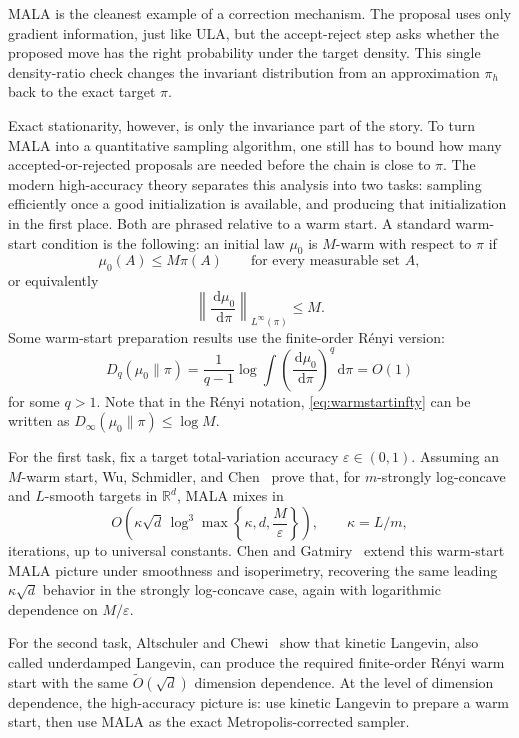 \documentclass[10pt,a4paper]{amsart}
\numberwithin{equation}{section}
\newcommand{\R}{\mathbb{R}}
\newcommand{\dd}{\,\mathrm{d}}
\newcommand{\deltaerr}{\varepsilon}
\newcommand{\tO}{\widetilde O}
\begin{document}
MALA is the cleanest example of a correction mechanism.  The
proposal uses only gradient information, just like ULA, but the accept-reject
step asks whether the proposed move has the right probability under the target
density.  This single density-ratio check changes the invariant distribution
from an approximation $\pi_h$ back to the exact target $\pi$.

Exact stationarity, however, is only the invariance part of the story.  To turn
MALA into a quantitative sampling algorithm, one still has to bound how many
accepted-or-rejected proposals are needed before the chain is close to $\pi$.
The modern high-accuracy theory separates this analysis into two tasks:
sampling efficiently once a good initialization is available, and producing
that initialization in the first place.  Both are phrased relative to a warm
start.  A standard warm-start condition is the following: an initial law
$\mu_0$ is $M$-warm with respect to
$\pi$ if
\[
    \mu_0(A)\leq M\pi(A)
    \qquad\text{for every measurable set }A,
\]
or equivalently
\begin{equation}\label{eq:warmstartinfty}
    \left\|\frac{\dd\mu_0}{\dd\pi}\right\|_{L^\infty(\pi)}
    \leq M.
\end{equation}
Some warm-start preparation results use the
finite-order R\'enyi version:
\[
    D_q(\mu_0\|\pi)
    =
    \frac{1}{q-1}
    \log
    \int
    \left(\frac{\dd\mu_0}{\dd\pi}\right)^q
    \dd\pi
    =O(1)
\]
for some $q>1$. Note that in the R\'enyi notation, \eqref{eq:warmstartinfty} can be written as
$D_\infty(\mu_0\|\pi)\leq \log M$.

For the first task, fix a target total-variation accuracy
$\deltaerr\in(0,1)$.  Assuming an $M$-warm start, Wu, Schmidler, and
Chen~\cite{wu2022minimaxmala} prove that, for $m$-strongly log-concave
and $L$-smooth targets in $\R^d$, MALA mixes in
\[
    O\!\left(
        \kappa\sqrt d\,
        \log^3\!\max\left\{\kappa,d,\frac{M}{\deltaerr}\right\}
    \right),
    \qquad \kappa=L/m,
\]
iterations, up to universal constants.  Chen and
Gatmiry~\cite{chen2023simplemala} extend this warm-start MALA picture under
smoothness and isoperimetry, recovering the same leading $\kappa\sqrt d$
behavior in the strongly log-concave case, again with logarithmic dependence
on $M/\deltaerr$.

For the second task, Altschuler and
Chewi~\cite{altschuler2023warmstarts} show that kinetic Langevin, also called
underdamped Langevin, can produce the required finite-order R\'enyi warm start
with the same $\tO(\sqrt d)$ dimension dependence.  At the level of
dimension dependence, the high-accuracy picture is: use kinetic Langevin to
prepare a warm start, then use MALA as the exact Metropolis-corrected sampler.
\end{document}
